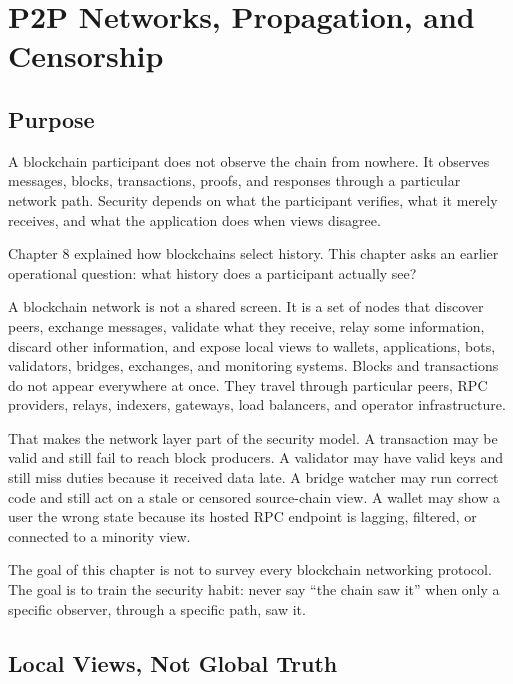\chapter{P2P Networks, Propagation, and Censorship}

\section{Purpose}

\begin{principlebox}
A blockchain participant does not observe the chain from nowhere. It observes messages, blocks, transactions, proofs, and responses through a particular network path. Security depends on what the participant verifies, what it merely receives, and what the application does when views disagree.
\end{principlebox}

Chapter 8 explained how blockchains select history. This chapter asks an earlier operational question: what history does a participant actually see?

A blockchain network is not a shared screen. It is a set of nodes that discover peers, exchange messages, validate what they receive, relay some information, discard other information, and expose local views to wallets, applications, bots, validators, bridges, exchanges, and monitoring systems. Blocks and transactions do not appear everywhere at once. They travel through particular peers, RPC providers, relays, indexers, gateways, load balancers, and operator infrastructure.

That makes the network layer part of the security model. A transaction may be valid and still fail to reach block producers. A validator may have valid keys and still miss duties because it received data late. A bridge watcher may run correct code and still act on a stale or censored source-chain view. A wallet may show a user the wrong state because its hosted RPC endpoint is lagging, filtered, or connected to a minority view.

The goal of this chapter is not to survey every blockchain networking protocol. The goal is to train the security habit: never say ``the chain saw it'' when only a specific observer, through a specific path, saw it.

\section{Local Views, Not Global Truth}

